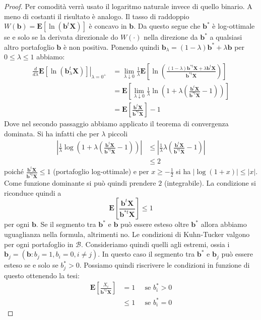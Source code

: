 \documentclass[a4paper,11pt]{book}
\theoremstyle{plain}
\theoremstyle{definition}
\theoremstyle{remark}
\newcommand{\X}{\bm{X}}
\newcommand{\B}{\bm{b}}
\begin{document}
\begin{proof}
	Per comodità verrà usato il logaritmo naturale invece di quello binario. A meno di costanti il risultato è analogo.\newline
	Il tasso di raddoppio $W(\B) = \mathbf{E}[\ln(\B^t\X)]$ è concavo in $\B$. Da questo segue che $\B^*$ è log-ottimale se e solo se la derivata direzionale do $W(\cdot)$ nella direzione da $\B^*$ a qualsiasi altro portafoglio $\B$ è non positiva. Ponendo quindi $\B_\lambda=(1-\lambda)\B^*+\lambda\B$ per $0\leq \lambda\leq 1$ abbiamo:
	\begin{equation*}
	\begin{split}
		\left.\frac{d}{d\lambda}\mathbf{E}[\ln(\B_\lambda^t\X)]\right\vert_{\lambda=0^+}
		& = \lim\limits_{\lambda\downarrow 0}\frac{1}{\lambda}\mathbf{E}\left[\ln\left(\frac{(1-\lambda)\B^{*t}\X + \lambda\B^t\X}{\B^{*t}\X}\right)\right]\\
		& = \mathbf{E}\left[\lim\limits_{\lambda\downarrow 0}\frac{1}{\lambda}\ln\left(1+\lambda\left(\frac{\B^t\X}{\B^{*t}\X}-1\right)\right)\right]\\
		& = \mathbf{E}\left[\frac{\B^t\X}{\B^{*t}\X}\right]-1
	\end{split}
	\end{equation*}
	Dove nel secondo passaggio abbiamo applicato il teorema di convergenza dominata. Si ha infatti che per $\lambda$ piccoli
	\begin{equation*}
		\begin{split}
		\left|\frac{1}{\lambda}\log\left(1+\lambda\left(\frac{\B^t\X}{\B^{*t}\X}-1\right)\right)\right|&\leq \left|\frac{1}{\lambda}\lambda\left(\frac{\B^t\X}{\B^{*t}\X}-1\right)\right|\\
		& \leq 2
		\end{split}
		\end{equation*}
	poiché $\frac{\B^t\X}{\B^{*t}\X}\leq 1$ (portafoglio log-ottimale) e per $x\geq -\frac{1}{2}$ si ha $|\log(1+x)|\leq|x|$. Come funzione dominante si può quindi prendere $2$ (integrabile).\newline
	La condizione si riconduce quindi a
	\begin{equation*}
		\mathbf{E}\left[\frac{\B^t\X}{\B^{*t}\X}\right]\leq 1
	\end{equation*}
	per ogni $\B$. Se il segmento tra $\B^*$ e $\B$ può essere esteso oltre $\B^*$ allora abbiamo uguaglianza nella formula, altrimenti no.\newline
	Le condizioni di Kuhn-Tucker valgono per ogni portafoglio in $\mathcal{B}$. Consideriamo quindi quelli agli estremi, ossia i $\B_j = (\B:b_j = 1, b_i=0, i\neq j)$. In questo caso il segmento tra $\B^*$ e $\B_j$ può essere esteso se e solo se $b^*_j>0$. Possiamo quindi riscrivere le condizioni in funzione di questo ottenendo la tesi:
	\begin{equation*}
	\begin{split}
	\mathbf{E}\left[\frac{X_i}{\B^{*t}\X}\right] & = 1 \;\;\;\;\; \text{se } b_i^*>0\\
	& \leq 1 \;\;\;\;\; \text{se } b_i^*=0
	\end{split}
	\end{equation*}
\end{proof}
\end{document}
